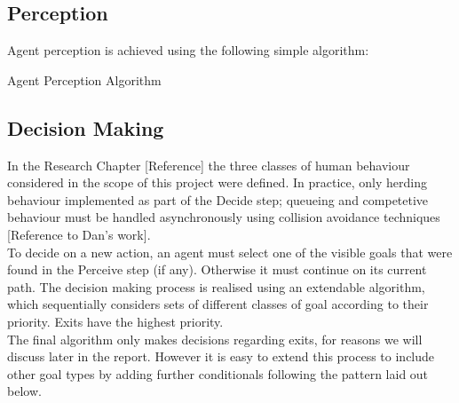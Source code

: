 \documentclass{article}
\begin{document}
\subsection{Perception}
Agent perception is achieved using the following simple algorithm:

\begin{algorithm}[H] %
 \SetAlgoLined
 \BlankLine
  \caption{Agent Perception Algorithm}
\end{algorithm}

\subsection{Decision Making}
In the Research Chapter [Reference] the three classes of human behaviour considered in the scope of this project were defined. In practice, only herding behaviour implemented as part of the Decide step; queueing and competetive behaviour must be handled asynchronously using collision avoidance techniques [Reference to Dan's work].\\
To decide on a new action, an agent must select one of the visible goals that were found in the Perceive step (if any). Otherwise it must continue on its current path. The decision making process is realised using an extendable algorithm, which sequentially considers sets of different classes of goal according to their priority. Exits have the highest priority.\\

The final algorithm only makes decisions regarding exits, for reasons we will discuss later in the report. However it is easy to extend this process to include other goal types by adding further conditionals following the pattern laid out below.\\

\begin{algorithm}[H]
 \SetAlgoLined
\end{algorithm}
\end{document}
